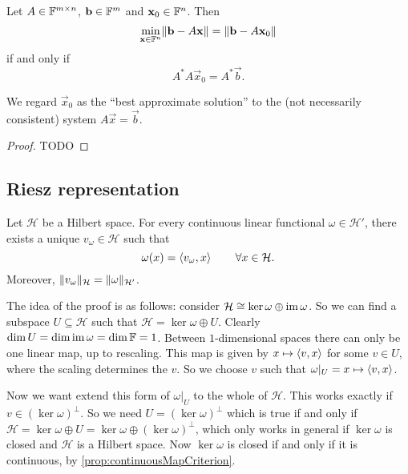 \begin{proposition}
Let $A\in\mathbb{F}^{m\times n}$, $\bm{\mathrm{b}}\in\mathbb{F}^m$ and $\bm{\mathrm{x}}_0\in\mathbb{F}^n$. Then
\[ \min_{\bm{\mathrm{x}}\in\mathbb{F}^n}\lVert\bm{\mathrm{b}}-A \bm{\mathrm{x}}\rVert = \lVert\bm{\mathrm{b}} - A \bm{\mathrm{x}}_0\rVert \]
if and only if
\[ A^*A \vec{x}_0 = A^* \vec{b}. \]
\end{proposition}
We regard $\vec{x}_0$ as the ``best approximate solution'' to the (not necessarily consistent) system $A \vec{x} = \vec{b}$.
\begin{proof}
TODO
\end{proof}

\subsection{Riesz representation}
\begin{theorem} \label{theorem:rieszRepresentation}
Let $\mathcal{H}$ be a Hilbert space. For every continuous linear functional $\omega\in \mathcal{H}'$, there exists a unique $v_\omega\in\mathcal{H}$ such that
\[ \omega(x) = \left\langle v_\omega, x \right\rangle \qquad \forall x\in\mathcal{H}. \]
Moreover, $\lVert v_\omega\rVert_\mathcal{H} = \lVert\omega\rVert_{\mathcal{H}'}$.
\end{theorem}  

The idea of the proof is as follows: consider $\mathcal{H} \cong \ker\omega \oplus \operatorname{im}\omega$. So we can find a subspace $U\subseteq \mathcal{H}$ such that $\mathcal{H} = \ker\omega\oplus U$. Clearly $\dim U = \dim\operatorname{im}\omega = \dim\mathbb{F} = 1$. Between $1$-dimensional spaces there can only be one linear map, up to rescaling. This map is given by $x\mapsto \left\langle v,x \right\rangle$ for some $v\in U$, where the scaling determines the $v$. So we choose $v$ such that $\omega|_U = x\mapsto \left\langle v,x \right\rangle$.

Now we want extend this form of $\omega|_U$ to the whole of $\mathcal{H}$. This works exactly if $v\in(\ker\omega)^\perp$. So we need $U=(\ker\omega)^\perp$ which is true if and only if $\mathcal{H} = \ker\omega\oplus U = \ker\omega\oplus (\ker\omega)^\perp$, which only works in general if $\ker\omega$ is closed and $\mathcal{H}$ is a Hilbert space. Now $\ker\omega$ is closed if and only if it is continuous, by \ref{prop:continuousMapCriterion}.

